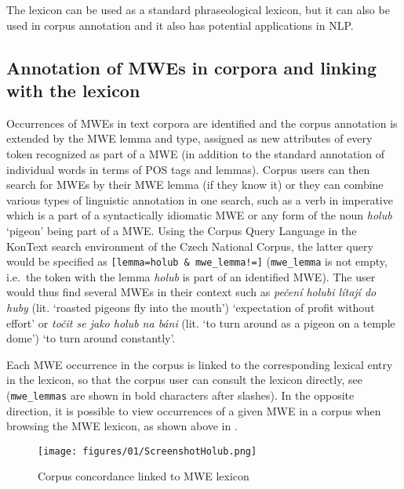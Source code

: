 \documentclass[output=paper,colorlinks,citecolor=brown]{langscibook}
\begin{document}
The lexicon can be used as a standard phraseological lexicon, but it can also be used in corpus annotation and it also has potential applications in NLP.


\subsection{Annotation of MWEs in corpora and linking with the lexicon}
\label{sec:annotation}
Occurrences of MWEs in text corpora are identified and the corpus annotation is extended by the MWE lemma and type, assigned as new attributes of every token recognized as part of a MWE (in addition to the standard annotation of individual words in terms of POS tags and lemmas). Corpus users can then search for MWEs by their MWE lemma (if they know it) or they can combine various types of linguistic annotation in one search, such as a verb in imperative which is a part of a syntactically idiomatic MWE or any form of the noun \textit{holub} `pigeon' being part of a MWE.
Using the Corpus Query Language in the KonText search environment \citep{Machalek:2020} of the Czech National Corpus, the latter query would be specified as \texttt{[lemma=\textquotedbl holub\textquotedbl{} \& mwe\_lemma!=\textquotedbl \textquotedbl]} (\texttt{mwe\_lemma} is not empty, i.e.\ the token with the lemma \textit{holub} is part of an identified MWE). The user would thus find several MWEs in their context such as \textit{pečení holubi lítají do huby} (lit. `roasted pigeons fly into the mouth') `expectation of profit without effort' or \textit{točit se jako holub na báni} (lit. `to turn around as a pigeon on a temple dome') `to turn around constantly'.

Each MWE occurrence in the corpus is linked to the corresponding lexical entry in the lexicon, so that the corpus user can consult the lexicon directly, see  (\texttt{mwe\_lemmas} are shown in bold characters after slashes). In the opposite direction, it is possible to view occurrences of a given MWE in a corpus when browsing the MWE lexicon, as shown above in .

\begin{figure}
    \centering
    \texttt{[image: figures/01/ScreenshotHolub.png]}
    \caption{Corpus concordance linked to MWE lexicon}
    \label{fig:holub}
\end{figure}
\end{document}
